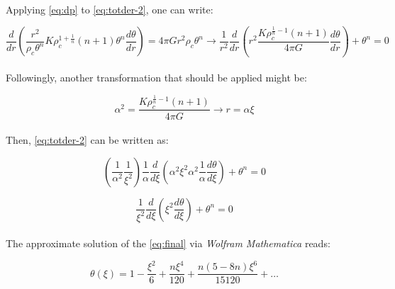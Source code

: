 \documentclass[letterpaper,12pt]{article}
\begin{document}
\paragraph{} Applying \eqref{eq:dp} to \eqref{eq:totder-2}, one can write:

\begin{equation}
    \frac{d}{dr}\left(\frac{r^2}{\rho_c \theta^n} K \rho_c^{1+\frac{1}{n}} \left(n+1\right)\theta^n \frac{d\theta}{dr}\right) = 4\pi G r^2 \rho_c \theta^n \rightarrow \frac{1}{r^2}\frac{d}{dr}\left(r^2 \frac{K \rho_c^{\frac{1}{n}-1} \left(n+1\right)}{4 \pi G} \frac{d\theta}{dr}\right) + \theta^n = 0
\end{equation}

\paragraph{} Followingly, another transformation that should be applied might be:

\begin{equation}
    \label{eq:alpha}
    \alpha^2 = \frac{K \rho_c^{\frac{1}{n}-1} \left(n+1\right)}{4 \pi G} \rightarrow r = \alpha \xi
\end{equation}

\paragraph{} Then, \eqref{eq:totder-2} can be written as:

\begin{equation*}
    \left(\frac{1}{\alpha^2}\frac{1}{\xi^2}\right)\frac{1}{\alpha}\frac{d}{d\xi}\left(\alpha^2\xi^2\alpha^2\frac{1}{\alpha}\frac{d\theta}{d\xi}\right) + \theta^n = 0
\end{equation*}

\begin{equation}
    \label{eq:final}
   \frac{1}{\xi^2}\frac{d}{d\xi}\left(\xi^2\frac{d\theta}{d\xi}\right) + \theta^n = 0
\end{equation}

\paragraph{} The approximate solution of the \eqref{eq:final} via \textit{Wolfram Mathematica} reads:

\begin{equation*}  
      \theta(\xi) =  1-\frac{\xi ^2}{6}+\frac{n \xi ^4}{120}+\frac{n (5-8 n) \xi ^6}{15120}+\dots
\end{equation*}
\end{document}
